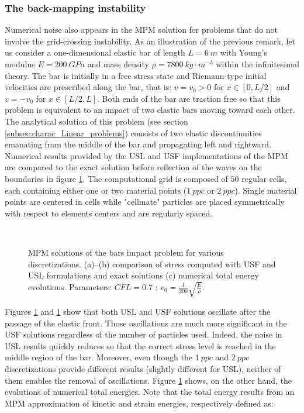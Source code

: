 \subsubsection*{The back-mapping instability}
Numerical noise also appears in the MPM solution for problems that do not involve the grid-crossing instability. As an illustration of the previous remark, let us consider a one-dimensional elastic bar of length $L=6\:m$ with Young's modulus $E=200 \:GPa$ and mass density $\rho=7800 \:kg\cdot m^{-3}$ within the infinitesimal theory. The bar is initially in a free stress state and Riemann-type initial velocities are prescribed along the bar, that is: $v=v_0>0$ for $x\in[0,L/2]$ and $v=-v_0$ for $x \in [L/2,L]$. Both ends of the bar are traction free so that this problem is equivalent to an impact of two elastic bars moving toward each other. The analytical solution of this problem (see section \ref{subsec:charac_Linear_problems}) consists of two elastic discontinuities emanating from the middle of the bar and propagating left and rightward. Numerical results provided by the USL and USF implementations of the MPM are compared to the exact solution before reflection of the waves on the boundaries in figure \ref{fig:US_diffusion}. The computational grid is composed of $50$ regular cells, each containing either one or two material points ($1\: ppc$ or $2\: ppc$). Single material points are centered in cells while "cellmate" particles are placed symmetrically with respect to elements centers and are regularly spaced. 
\begin{figure}[h!]
  \centering
  {  \label{subfig:US_diffusion_10}}
  {  \label{subfig:US_diffusion_25}}\\
  {  \label{subfig:US_energies}}
  \caption{MPM solutions of the bars impact problem for various discretizations. (a)--(b) comparison of stress computed with USF and USL formulations and exact solutions (c) numerical total energy evolutions. Parameters: $CFL=0.7$ ; $v_0=\frac{1}{200}\sqrt{\frac{E}{\rho}}$.}
  \label{fig:US_diffusion}
\end{figure}
Figures \ref{fig:US_diffusion} and \ref{fig:US_diffusion} show that both USL and USF solutions oscillate after the passage of the elastic front. Those oscillations are much more significant in the USF solutions regardless of the number of particles used. Indeed, the noise in USL results quickly reduces so that the correct stress level is reached in the middle region of the bar. Moreover, even though the $1\: ppc$ and $2\: ppc$ discretizations provide different results (slightly different for USL), neither of them enables the removal of oscillations. Figure \ref{fig:US_diffusion} shows, on the other hand, the evolutions of numerical total energies. Note that the total energy results from an MPM approximation of kinetic and strain energies, respectively defined as:
